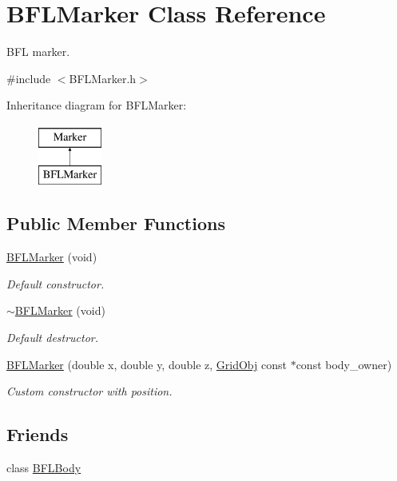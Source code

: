 \hypertarget{class_b_f_l_marker}{}\section{B\+F\+L\+Marker Class Reference}
\label{class_b_f_l_marker}


B\+FL marker.  




{\ttfamily \#include $<$B\+F\+L\+Marker.\+h$>$}

Inheritance diagram for B\+F\+L\+Marker\+:\begin{figure}[H]
\begin{center}
\leavevmode
\includegraphics[height=2.000000cm]{class_b_f_l_marker}
\end{center}
\end{figure}
\subsection*{Public Member Functions}
\begin{DoxyCompactItemize}
\item 
\hyperlink{class_b_f_l_marker_a5d6b8e4b1cfac580b86aa0f3b2f22c24}{B\+F\+L\+Marker} (void)
\begin{DoxyCompactList}\small\item\em Default constructor. \end{DoxyCompactList}\item 
\hyperlink{class_b_f_l_marker_a10ac169924a35ee14599992290540447}{$\sim$\+B\+F\+L\+Marker} (void)
\begin{DoxyCompactList}\small\item\em Default destructor. \end{DoxyCompactList}\item 
\hyperlink{class_b_f_l_marker_a369aab6d44631b56ac1ffec5f6c7ceae}{B\+F\+L\+Marker} (double x, double y, double z, \hyperlink{class_grid_obj}{Grid\+Obj} const $\ast$const body\+\_\+owner)
\begin{DoxyCompactList}\small\item\em Custom constructor with position. \end{DoxyCompactList}\end{DoxyCompactItemize}
\subsection*{Friends}
\begin{DoxyCompactItemize}
\item 
class \hyperlink{class_b_f_l_marker_a253e046b9808d9a35fda96a16d22edb3}{B\+F\+L\+Body}
\end{DoxyCompactItemize}

